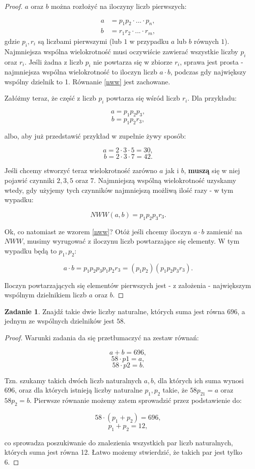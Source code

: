 \documentclass[11pt]{article}
\theoremstyle{definition}
\newtheorem{zad}{Zadanie}
\numberwithin{zad}{section}
\begin{document}
\begin{proof}
$a$ oraz $b$ można rozłożyć na iloczyny liczb pierwszych:

\begin{align*}
a &= p_1p_2\cdot...\cdot p_n,\\
b &= r_1r_2\cdot...\cdot r_m,
\end{align*}
gdzie $p_i, r_i$ są liczbami pierwszymi (lub $1$ w przypadku $a$ lub $b$ równych $1$). Najmniejsza wspólna wielokrotność musi oczywiście zawierać wszystkie liczby $p_i$ oraz $r_i$. Jeśli żadna z liczb $p_i$ nie powtarza się w zbiorze $r_i$, sprawa jest prosta - najmniejsza wspólna wielokrotność to iloczyn liczb $a\cdot b$, podczas gdy największy wspólny dzielnik to 1. Równanie \ref{nww} jest zachowane. 

Załóżmy teraz, że część z liczb $p_i$ powtarza się wśród liczb $r_i$. Dla przykładu:

$$a = p_1p_2p_3,$$
$$b = p_1p_2r_3,$$

albo, aby już przedstawić przykład w zupełnie żywy sposób:

$$a = 2\cdot 3\cdot 5 = 30,$$
$$b = 2\cdot 3\cdot 7 = 42.$$

Jeśli chcemy stworzyć teraz wielokrotność zarówno $a$ jak i $b$, \textbf{muszą} się w niej pojawić czynniki $2, 3, 5$ oraz $7$. Najmniejszą wspólną wielokrotność uzyskamy wtedy, gdy użyjemy tych czynników najmniejszą możliwą ilość razy - w tym wypadku:

$$NWW(a,b) = p_1p_2p_3 r_3.$$

Ok, co natomiast ze wzorem \ref{nww}? Otóż jeśli chcemy iloczyn $a\cdot b$ zamienić na $NWW$, musimy wyrugować z iloczynu liczb powtarzające się elementy. W tym wypadku będą to $p_1, p_2$:

$$a\cdot b = p_1p_2p_3p_1p_2r_3 = (p_1p_2)(p_1p_2p_3r_3).$$

Iloczyn powtarzających się elementów pierwszych jest - z założenia - największym wspólnym dzielnikiem liczb $a$ oraz $b$.

\end{proof}

\begin{zad}
Znajdź takie dwie liczby naturalne, których suma jest równa $696$, a jednym ze wspólnych dzielników jest $58$.
\end{zad}

\begin{proof}
Warunki zadania da się przetłumaczyć na zestaw równań:

$$a+b = 696,$$
$$58\cdot p1 = a,$$
$$58\cdot p2 = b.$$

Tzn. szukamy takich dwóch liczb naturalnych $a,b$, dla których ich suma wynosi 696, oraz dla których istnieją liczby naturalne $p_1,p_2$ takie, że $58p_21 = a$ oraz $58p_2 = b$. Pierwsze równanie możemy zatem sprowadzić przez podstawienie do:

$$58\cdot(p_1+p_2) = 696,$$
$$p_1+p_2 = 12,$$

co sprowadza poszukiwanie do znalezienia wszystkich par liczb naturalnych, których suma jest równa 12. Łatwo możemy stwierdzić, że takich par jest tylko 6.
\end{proof}
\end{document}
